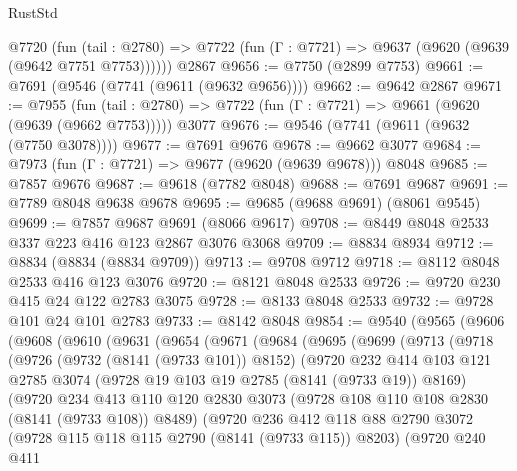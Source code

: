 \begin{lexlean}{RustStd}
\begin{coremodule}
    @7720
      (fun (tail : @2780) => @7722 (fun (Γ : @7721) => @9637 (@9620 (@9639 (@9642 @7751 @7753))))))
    @2867
@9656 := @7750 (@2899 @7753)
@9661 := @7691 (@9546 (@7741 (@9611 (@9632 @9656))))
@9662 := @9642 @2867
@9671 := @7955
    (fun (tail : @2780) => @7722 (fun (Γ : @7721) => @9661 (@9620 (@9639 (@9662 @7753)))))
    @3077
@9676 := @9546 (@7741 (@9611 (@9632 (@7750 @3078))))
@9677 := @7691 @9676
@9678 := @9662 @3077
@9684 := @7973 (fun (Γ : @7721) => @9677 (@9620 (@9639 @9678))) @8048
@9685 := @7857 @9676
@9687 := @9618 (@7782 @8048)
@9688 := @7691 @9687
@9691 := @7789 @8048 @9638 @9678
@9695 := @9685 (@9688 @9691) (@8061 @9545)
@9699 := @7857 @9687 @9691 (@8066 @9617)
@9708 := @8449 @8048 @2533 @337 @223 @416 @123 @2867 @3076 @3068
@9709 := @8834 @8934
@9712 := @8834 (@8834 (@8834 @9709))
@9713 := @9708 @9712
@9718 := @8112 @8048 @2533 @416 @123 @3076
@9720 := @8121 @8048 @2533
@9726 := @9720 @230 @415 @24 @122 @2783 @3075
@9728 := @8133 @8048 @2533
@9732 := @9728 @101 @24 @101 @2783
@9733 := @8142 @8048
@9854 := @9540
    (@9565
      (@9606
        (@9608
          (@9610
            (@9631
              (@9654
                (@9671
                  (@9684
                    (@9695
                      (@9699
                        (@9713
                          (@9718
                            (@9726
                              (@9732 (@8141 (@9733 @101)) @8152)
                              (@9720
                                @232
                                @414
                                @103
                                @121
                                @2785
                                @3074
                                (@9728 @19 @103 @19 @2785 (@8141 (@9733 @19)) @8169)
                                (@9720
                                  @234
                                  @413
                                  @110
                                  @120
                                  @2830
                                  @3073
                                  (@9728 @108 @110 @108 @2830 (@8141 (@9733 @108)) @8489)
                                  (@9720
                                    @236
                                    @412
                                    @118
                                    @88
                                    @2790
                                    @3072
                                    (@9728 @115 @118 @115 @2790 (@8141 (@9733 @115)) @8203)
                                    (@9720
                                      @240
                                      @411

\end{coremodule}
\end{lexlean}
